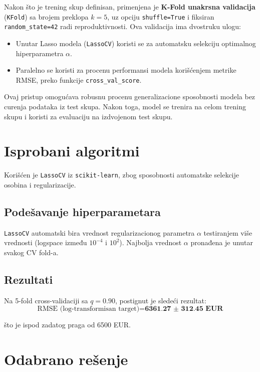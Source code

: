 \documentclass[a4paper,12pt]{article}
\begin{document}
Nakon što je trening skup definisan, primenjena je \textbf{K-Fold unakrsna validacija} (\texttt{KFold}) sa brojem preklopa $k = 5$, uz opciju \texttt{shuffle=True} i fiksiran \texttt{random\_state=42} radi reproduktivnosti. Ova validacija ima dvostruku ulogu:

\begin{itemize}
    \item Unutar Lasso modela (\texttt{LassoCV}) koristi se za automatsku selekciju optimalnog hiperparametra $\alpha$.
    \item Paralelno se koristi za procenu performansi modela korišćenjem metrike RMSE, preko funkcije \texttt{cross\_val\_score}.
\end{itemize}

Ovaj pristup omogućava robusnu procenu generalizacione sposobnosti modela bez curenja podataka iz test skupa. Nakon toga, model se trenira na celom trening skupu i koristi za evaluaciju na izdvojenom test skupu.

\section{Isprobani algoritmi}

Korišćen je \texttt{LassoCV} iz \texttt{scikit-learn}, zbog sposobnosti automatske selekcije osobina i regularizacije.

\subsection{Podešavanje hiperparametara}

\texttt{LassoCV} automatski bira vrednost regularizacionog parametra $\alpha$ testiranjem više vrednosti (logspace između $10^{-4}$ i $10^2$). Najbolja vrednost $\alpha$ pronađena je unutar svakog CV fold-a.

\subsection{Rezultati}

Na 5-fold cross-validaciji sa $q=0.90$, postignut je sledeći rezultat:
\[
\text{RMSE (log-transformisan target)} = \textbf{6361.27 ± 312.45 EUR}
\]

što je ispod zadatog praga od 6500 EUR.

\section{Odabrano rešenje}
\end{document}
